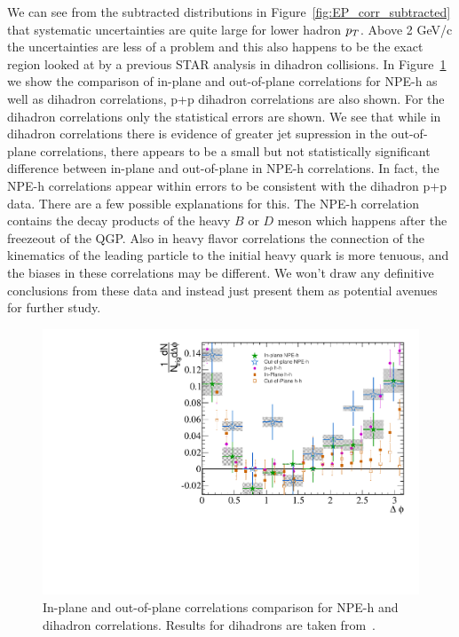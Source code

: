 We can see from the subtracted distributions in Figure~\ref{fig:EP_corr_subtracted} that systematic uncertainties are quite large for lower hadron $p_{T}$. Above 2 GeV/c the uncertainties are less of a problem and this also happens to be the exact region looked at by a previous STAR analysis in dihadron collisions. In Figure~\ref{fig:EP_comparison} we show the comparison of in-plane and out-of-plane correlations for NPE-h as well as dihadron correlations, p+p dihadron correlations are also shown. For the dihadron correlations only the statistical errors are shown. We see that while in dihadron correlations there is evidence of greater jet supression in the out-of-plane correlations, there appears to be a small but not statistically significant difference between in-plane and out-of-plane in NPE-h correlations. In fact, the NPE-h correlations appear within errors to be consistent with the dihadron p+p data. There are a few possible explanations for this. The NPE-h correlation contains the decay products of the heavy $B$ or $D$ meson which happens after the freezeout of the QGP. Also in heavy flavor correlations the connection of the kinematics of the leading particle to the initial heavy quark is more tenuous, and the biases in these correlations may be different. We won't draw any definitive conclusions from these data and instead just present them as potential avenues for further study.

\begin{figure}[htbp]
\begin{center}
\includegraphics[scale=.75]{Plots/Correlations/EP/NPE_subtracted_eh_corr_in-out_comp_with_pub_primpt_4_5_cent_2_5_assopt_3_4.pdf}
\end{center}
\caption[Event Plane Dependent Correlation Comparison]{In-plane and out-of-plane correlations comparison for NPE-h and dihadron correlations. Results for dihadrons are taken from~\cite{STAREPshort}.}
\label{fig:EP_comparison}
\end{figure}

